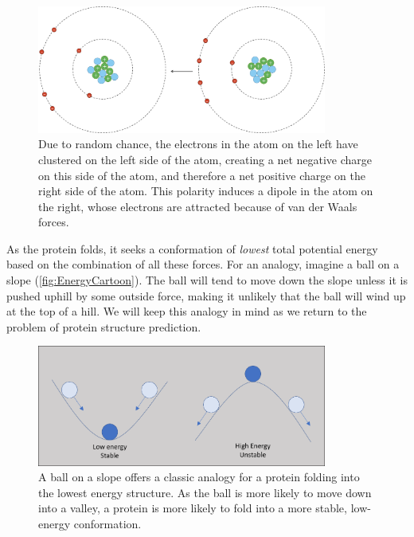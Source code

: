 
\begin{figure}[h]
	\centering
	\mySfFamily
	\includegraphics[width = 0.85\textwidth]{../images/van_der_waals.png}
	\caption{Due to random chance, the electrons in the atom on the left have clustered on the left side of the atom, creating a net negative charge on this side of the atom, and therefore a net positive charge on the right side of the atom. This polarity induces a dipole in the atom on the right, whose electrons are attracted because of van der Waals forces.}
	\label{fig:van_der_waals}
\end{figure}

As the protein folds, it seeks a conformation of \textit{lowest} total potential energy based on the combination of all these forces. For an analogy, imagine a ball on a slope (\autoref{fig:EnergyCartoon}). The ball will tend to move down the slope unless it is pushed uphill by some outside force, making it unlikely that the ball will wind up at the top of a hill. We will keep this analogy in mind as we return to the problem of protein structure prediction.\\

\begin{figure}[h]
	\centering
	\mySfFamily
	\includegraphics[width = 0.85\textwidth]{../images/EnergyCartoon.png}
	\caption{A ball on a slope offers a classic analogy for a protein folding into the lowest energy structure. As the ball is more likely to move down into a valley, a protein is more likely to fold into a more stable, low-energy conformation.}
	\label{fig:EnergyCartoon}
\end{figure}


